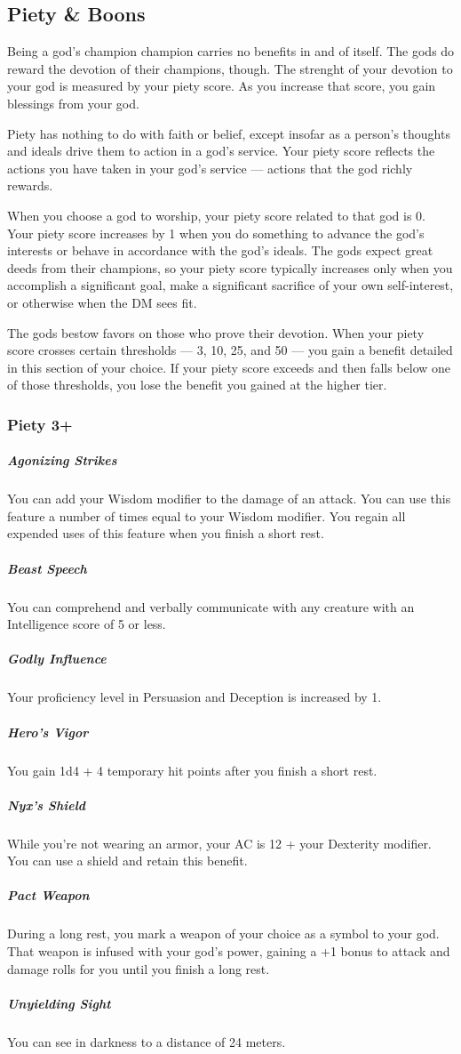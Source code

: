 \subsection*{Piety \& Boons} \label{ssec::pietyandboons}
Being a god's champion champion carries no benefits in and of itself.
The gods do reward the devotion of their champions, though.
The strenght of your devotion to your god is measured by your piety score.
As you increase that score, you gain blessings from your god.

Piety has nothing to do with faith or belief, except insofar as a person's thoughts and ideals drive them to action in a god's service.
Your piety score reflects the actions you have taken in your god's service --- actions that the god richly rewards.

When you choose a god to worship, your piety score related to that god is 0.
Your piety score increases by 1 when you do something to advance the god's interests or behave in accordance with the god's ideals.
The gods expect great deeds from their champions, so your piety score typically increases only when you accomplish a significant goal, make a significant sacrifice of your own self-interest, or otherwise when the DM sees fit.

The gods bestow favors on those who prove their devotion.
When your piety score crosses certain thresholds --- 3, 10, 25, and 50 --- you gain a benefit detailed in this section of your choice.
If your piety score exceeds and then falls below one of those thresholds, you lose the benefit you gained at the higher tier.

\subsubsection{Piety 3+}
    \subparagraph{Agonizing Strikes}
        You can add your Wisdom modifier to the damage of an attack.
        You can use this feature a number of times equal to your Wisdom modifier.
        You regain all expended uses of this feature when you finish a short rest.
    \subparagraph{Beast Speech}
        You can comprehend and verbally communicate with any creature with an Intelligence score of 5 or less.
    \subparagraph{Godly Influence}
        Your proficiency level in Persuasion and Deception is increased by 1.
    \subparagraph{Hero's Vigor}
        You gain 1d4 + 4 temporary hit points after you finish a short rest.
    \subparagraph{Nyx's Shield}
        While you're not wearing an armor, your AC is 12 + your Dexterity modifier.
        You can use a shield and retain this benefit.
    \subparagraph{Pact Weapon}
        During a long rest, you mark a weapon of your choice as a symbol to your god.
        That weapon is infused with your god's power, gaining a +1 bonus to attack and damage rolls for you until you finish a long rest.
    \subparagraph{Unyielding Sight}
        You can see in darkness to a distance of 24 meters.

